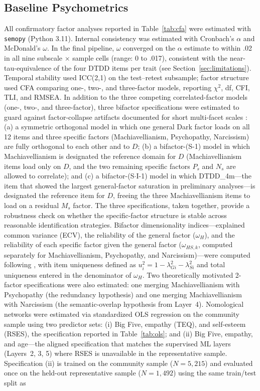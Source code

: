 \documentclass[11pt,twocolumn]{article}
\begin{document}
\subsection{Baseline Psychometrics}

All confirmatory factor analyses reported in Table~\ref{tab:cfa} were estimated with \texttt{semopy} (Python 3.11). Internal consistency was estimated with Cronbach's $\alpha$ and McDonald's $\omega$. In the final pipeline, $\omega$ converged on the $\alpha$ estimate to within .02 in all nine subscale $\times$ sample cells (range: 0 to .017), consistent with the near-tau-equivalence of the four DTDD items per trait (see Section~\ref{sec:limitations}). Temporal stability used ICC(2,1) on the test--retest subsample; factor structure used CFA comparing one-, two-, and three-factor models, reporting $\chi^2$, df, CFI, TLI, and RMSEA. In addition to the three competing correlated-factor models (one-, two-, and three-factor), three bifactor specifications were estimated to guard against factor-collapse artifacts documented for short multi-facet scales \citep{knitter2025, eid2017}: (a) a symmetric orthogonal model in which one general Dark factor loads on all 12 items and three specific factors (Machiavellianism, Psychopathy, Narcissism) are fully orthogonal to each other and to $D$; (b) a bifactor-(S-1) model \citep{eid2017} in which Machiavellianism is designated the reference domain for $D$ (Machiavellianism items load only on $D$, and the two remaining specific factors $P_s$ and $N_s$ are allowed to correlate); and (c) a bifactor-(S$\cdot$I-1) model in which DTDD\_4m---the item that showed the largest general-factor saturation in preliminary analyses---is designated the reference item for $D$, freeing the three Machiavellianism items to load on a residual $M_s$ factor. The three specifications, taken together, provide a robustness check on whether the specific-factor structure is stable across reasonable identification strategies. Bifactor dimensionality indices---explained common variance (ECV), the reliability of the general factor ($\omega_H$), and the reliability of each specific factor given the general factor ($\omega_{HS,k}$, computed separately for Machiavellianism, Psychopathy, and Narcissism)---were computed following \citet{rodriguez2016}, with item uniqueness defined as $u_i^2 = 1 - \lambda_{Gi}^2 - \lambda_{Si}^2$ and total uniqueness entered in the denominator of $\omega_H$. Two theoretically motivated 2-factor specifications were also estimated: one merging Machiavellianism with Psychopathy (the \citealp{miller2017} redundancy hypothesis) and one merging Machiavellianism with Narcissism (the semantic-overlap hypothesis from Layer~4). Nomological networks were estimated via standardized OLS regression on the community sample using two predictor sets: (i) Big Five, empathy (TEQ), and self-esteem (RSES), the specification reported in Table~\ref{tab:ols}; and (ii) Big Five, empathy, and age---the aligned specification that matches the supervised ML layers (Layers~2, 3, 5) where RSES is unavailable in the representative sample. Specification (ii) is trained on the community sample ($N = 5{,}215$) and evaluated once on the held-out representative sample ($N = 1{,}492$) using the same train/test split as 
\end{document}
